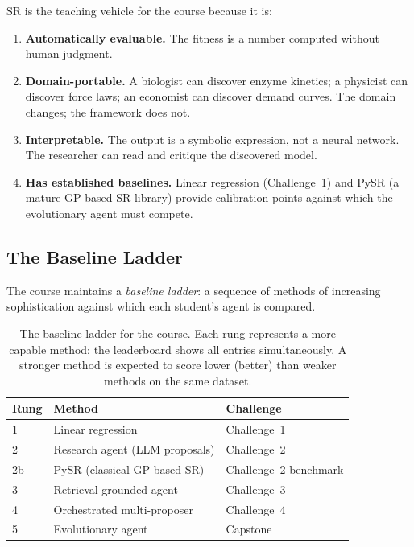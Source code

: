 SR is the teaching vehicle for the course because it is:
\begin{enumerate}
\item \textbf{Automatically evaluable.} The fitness is a number computed without human judgment.
\item \textbf{Domain-portable.} A biologist can discover enzyme kinetics; a physicist can discover force laws; an economist can discover demand curves.
The domain changes; the framework does not.
\item \textbf{Interpretable.} The output is a symbolic expression, not a neural network.
The researcher can read and critique the discovered model.
\item \textbf{Has established baselines.} Linear regression (Challenge~1) and PySR (a mature GP-based SR library) provide calibration points against which the evolutionary agent must compete.
\end{enumerate}

\subsection{The Baseline Ladder}

The course maintains a \emph{baseline ladder}: a sequence of methods of increasing sophistication against which each student's agent is compared.

\begin{table}[htb!]
\begin{center}
\begin{tabular}{lll}
\toprule
\textbf{Rung} & \textbf{Method} & \textbf{Challenge} \\
\midrule
1 & Linear regression & Challenge~1 \\
2 & Research agent (LLM proposals) & Challenge~2 \\
2b & PySR (classical GP-based SR) & Challenge~2 benchmark \\
3 & Retrieval-grounded agent & Challenge~3 \\
4 & Orchestrated multi-proposer & Challenge~4 \\
5 & Evolutionary agent & Capstone \\
\bottomrule
\end{tabular}
\caption{The baseline ladder for the course.
Each rung represents a more capable method; the leaderboard shows all entries simultaneously.
A stronger method is expected to score lower (better) than weaker methods on the same dataset.}
\label{table:BaselineLadder}
\end{center}
\end{table}

